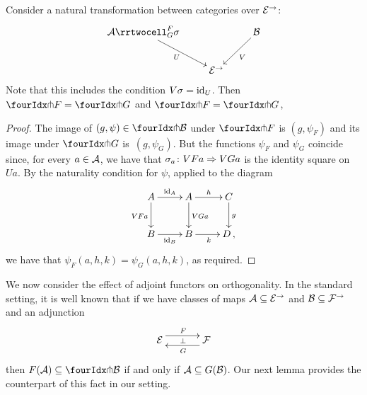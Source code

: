 \documentclass[reqno,10pt,a4paper,oneside]{amsart}
\begin{document}
\begin{proposition}
Consider a natural transformation between categories over $\catE^{\to}$:
\[
\xymatrix{
  \cal{A}
  \rrtwocell_G^F{\sigma}
 \ar[dr]_{U}
&&
  \cal{B}
  \ar[dl]^{V}
\\&
  \catE^{\to}
}
\]
Note that this includes the condition $V \sigma = \id_U$.
Then $\liftr{F} = \liftr{G}$ and $\liftl{F} = \liftl{G}$, 
\end{proposition}

\begin{proof} The image of $(g, \psi) \in \liftr{\cal{B}}$ under $\liftr{F}$ is $(g, \psi_F)$ and its
image under $\liftr{G}$ is~$(g, \psi_G)$. But the functions $\psi_F$ and $\psi_G$ coincide since, for
every $a \in \cal{A}$, we have that $\sigma_a \co VFa \Rightarrow VGa$ is the identity square on $Ua$. 
By the naturality condition for $\psi$, applied to the diagram 
\[
\xymatrix{
A \ar[r]^{\id_A} \ar[d]_{VFa}  & A \ar[d]^{VGa} \ar[r]^{h}  & C \ar[d]^g \\
B \ar[r]_{\id_B} & B \ar[r]_{k} & D \, ,}
\]
we have  that $\psi_F(a, h, k) = \psi_G(a, h, k)$, as required.
\end{proof} 

\medskip

We now consider the effect of adjoint functors on orthogonality. In the standard setting, it is well known that if 
we have classes of maps $\cal{A} \subseteq \cal{E}^\to$ and $\cal{B} \subseteq \cal{F}^\to$ and an adjunction
\[
\xymatrix@C+1em{
  \cal{E}
  \ar@<5pt>[r]^{F}
  \ar@{}[r]|{\bot}
&
  \cal{F}
  \ar@<5pt>[l]^{G}
}
\]
then $F(\cal{A}) \subseteq \liftl{\cal{B}}$ if and only if $\cal{A} \subseteq G(\cal{B})$. Our next lemma provides the counterpart of this fact in our setting.
\end{document}
